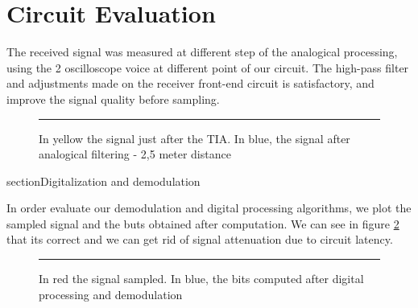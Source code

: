 \section{Circuit Evaluation}

The received signal was measured at different step of the analogical processing, using the 2 oscilloscope voice at different point of our circuit. The high-pass filter and adjustments made on the receiver front-end circuit is satisfactory, and improve the signal quality before sampling.

\begin{figure}[htbp]
	\centering
		\rule{35em}{0.5pt}
		\caption[In yellow the signal just after the TIA. In blue, the signal after analogical filtering - 2,5 meter distance]{In yellow the signal just after the TIA. In blue, the signal after analogical filtering - 2,5 meter distance}
		\label{fig:circuit-compare}
	\end{figure}
	
section{Digitalization and demodulation}

In order evaluate our demodulation and digital processing algorithms, we plot the sampled signal and the buts obtained after computation. We can see in figure \ref{fig:numeric} that its correct and we can get rid of signal attenuation due to circuit latency.
\begin{figure}[htbp]
	\centering
		\rule{35em}{0.5pt}
		\caption[In red the signal sampled. In blue, the bits computed after digital processing and demodulation]{In red the signal sampled. In blue, the bits computed after digital processing and demodulation}
		\label{fig:numeric}
	\end{figure}

